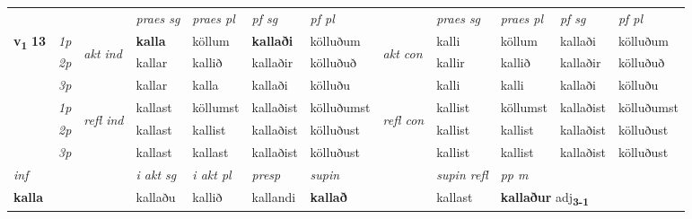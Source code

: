\begin{longtable}[l]{X>{\footnotesize\itshape}llXXXXlXXXX}
 & &   & \textit{praes sg}  & \textit{praes pl}    & \textit{ pf sg} & \textit{pf pl} & & \textit{praes sg}  & \textit{praes pl}    & \textit{pf sg} & \textit{pf pl }  \\ \cmidrule{4-7} \cmidrule{9-12}
 \multirow{2}{*}{{{\textbf{v{\textsubscript{1}}} \Large{\textbf{13}}}}}  & 1p & \multirow{3}{*}{\begin{turn}{90}\textit{akt ind}\end{turn}} & \textbf{kalla} & köllum & \textbf{kallaði} & kölluðum & \multirow{3}{*}{\begin{turn}{90}\textit{akt con}\end{turn}} &kalli & köllum & kallaði & kölluðum\\*
 & 2p &  &  kallar  & kallið & kallaðir & kölluðuð & & kallir & kallið & kallaðir & kölluðuð \\*
 & 3p &  & kallar & kalla & kallaði & kölluðu & & kalli & kalli& kallaði & kölluðu \\*
\cmidrule{4-7} \cmidrule{9-12}
 & 1p & \multirow{3}{*}{\begin{turn}{90}\textit{refl ind}\end{turn}}  & kallast & köllumst & kallaðist & kölluðumst & \multirow{3}{*}{\begin{turn}{90}\textit{refl con}\end{turn}}  &kallist & köllumst & kallaðist & kölluðumst \\*
 & 2p &  & kallast & kallist & kallaðist & kölluðust & &kallist & kallist & kallaðist & kölluðust \\*
 & 3p  & & kallast & kallast & kallaðist & kölluðust & & kallist & kallist& kallaðist & kölluðust \\*
\cmidrule{4-7} \cmidrule{9-12}

   {\textit{inf}} & &  & \textit{i akt sg} & \textit{i akt pl}   & \textit{presp} & \textit{supin} && \textit{supin refl} & \textit{pp m} \\*
  {\textbf{kalla}} & && kallaðu  & kallið   & kallandi &  \textbf{kallað} && kallast & \multicolumn{2}{l}{\textbf{kallaður} adj\textbf{\textsubscript{3-1}}} \\*

\midrule


\end{longtable}
